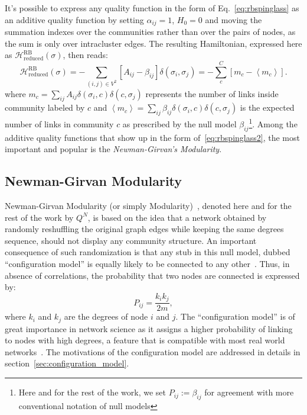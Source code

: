 It's possible to express any quality function in the form of Eq.~\ref{eq:rbspinglass} as an additive quality function by setting $\alpha_{ij}=1$, $H_0=0$ and moving the summation indexes over the communities rather than over the pairs of nodes, as the sum is only over intracluster edges. The resulting Hamiltonian, expressed here as $\mathcal{H}^{\textrm{RB}}_{\textrm{reduced}}(\sigma)$, then reads:
\begin{equation}\label{eq:rbspinglass2}
\mathcal{H}^{\textrm{RB}}_{\textrm{reduced}}(\sigma) = -\sum_{(i,j) \in V^2} \left[ A_{ij} - \beta_{ij} \right] \delta(\sigma_i,\sigma_j) = - \sum \limits_{c}^C \left[ m_c - \left< m_c \right> \right].
\end{equation}
where $m_c=\sum_{ij}A_{ij}\delta(\sigma_i,c)\delta(c,\sigma_j)$ represents the number of links inside community labeled by $c$ and $\left <m_c \right >=\sum_{ij}\beta_{ij}\delta(\sigma_i,c)\delta(c,\sigma_j)$ is the expected number of links in community $c$ as prescribed by the null model $\beta_{ij}$\footnote{Here and for the rest of the work, we set $P_{ij}:=\beta_{ij}$ for agreement with more conventional notation of null models}. 
Among the additive quality functions that show up in the form of~\ref{eq:rbspinglass2}, the most important and popular is the \emph{Newman-Girvan's Modularity}.

\subsection{Newman-Girvan Modularity}\label{sec:newman_modularity}
Newman-Girvan Modularity (or simply Modularity)~\cite{newman2006}, denoted here and for the rest of the work by $Q^N$, is based on the idea that a network obtained by randomly reshuffling the original graph edges while keeping the same degrees sequence, should not display any community structure. 
An important consequence of such randomization is that any stub in this null model, dubbed ``configuration model'' is equally likely to be connected to any other~\cite{newman2010book}. Thus, in absence of correlations, the probability that two nodes are connected is expressed by:
\begin{equation}\label{eq:configuration_model}
P_{ij} = \frac{k_i k_j}{2m},
\end{equation}
where $k_i$ and $k_j$ are the degrees of node $i$ and $j$. The ``configuration model''  is of great importance in network science as it assigns a higher probability of linking to nodes with high degrees, a feature that is compatible with most real world networks~\cite{newman2010book}.
The motivations of the configuration model are addressed in details in section~\ref{sec:configuration_model}.

